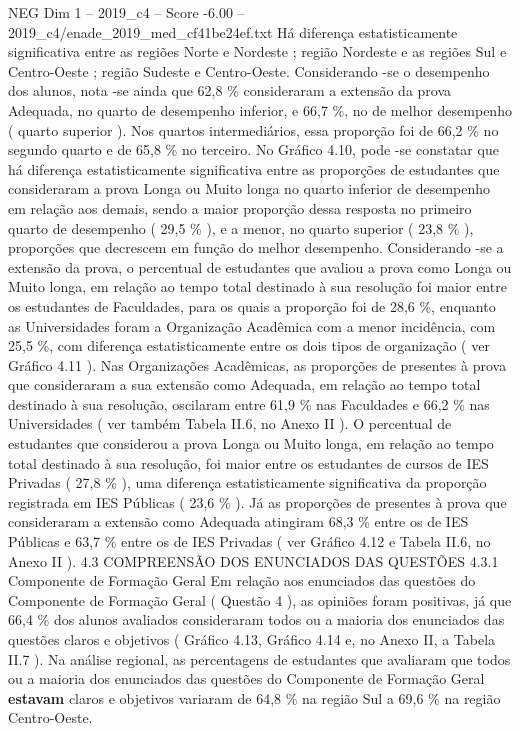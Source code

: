 \begin{textsample}{NEG Dim 1 – 2019\_c4 – Score -6.00 – 2019\_c4/enade\_2019\_med\_cf41be24ef.txt}
Há diferença estatisticamente significativa entre as regiões Norte e Nordeste ; região Nordeste e as regiões Sul e Centro-Oeste ; região Sudeste e Centro-Oeste.
Considerando -se o desempenho dos alunos, nota -se ainda que 62,8 \% consideraram a extensão da prova Adequada, no quarto de desempenho inferior, e 66,7 \%, no de melhor desempenho ( quarto superior ).
Nos quartos intermediários, essa proporção foi de 66,2 \% no segundo quarto e de 65,8 \% no terceiro.
No Gráfico 4.10, pode -se constatar que há diferença estatisticamente significativa entre as proporções de estudantes que consideraram a prova Longa ou Muito longa no quarto inferior de desempenho em relação aos demais, sendo a maior proporção dessa resposta no primeiro quarto de desempenho ( 29,5 \% ), e a menor, no quarto superior ( 23,8 \% ), proporções que decrescem em função do melhor desempenho.
Considerando -se a extensão da prova, o percentual de estudantes que avaliou a prova como Longa ou Muito longa, em relação ao tempo total destinado à sua resolução foi maior entre os estudantes de Faculdades, para os quais a proporção foi de 28,6 \%, enquanto as Universidades foram a Organização Acadêmica com a menor incidência, com 25,5 \%, com diferença estatisticamente entre os dois tipos de organização ( ver Gráfico 4.11 ).
Nas Organizações Acadêmicas, as proporções de presentes à prova que consideraram a sua extensão como Adequada, em relação ao tempo total destinado à sua resolução, oscilaram entre 61,9 \% nas Faculdades e 66,2 \% nas Universidades ( ver também Tabela II.6, no Anexo II ).
O percentual de estudantes que considerou a prova Longa ou Muito longa, em relação ao tempo total destinado à sua resolução, foi maior entre os estudantes de cursos de IES Privadas ( 27,8 \% ), uma diferença estatisticamente significativa da proporção registrada em IES Públicas ( 23,6 \% ).
Já as proporções de presentes à prova que consideraram a extensão como Adequada atingiram 68,3 \% entre os de IES Públicas e 63,7 \% entre os de IES Privadas ( ver Gráfico 4.12 e Tabela II.6, no Anexo II ). 4.3 COMPREENSÃO DOS ENUNCIADOS DAS QUESTÕES 4.3.1 Componente de Formação Geral Em relação aos enunciados das questões do Componente de Formação Geral ( Questão 4 ), as opiniões foram positivas, já que 66,4 \% dos alunos avaliados consideraram todos ou a maioria dos enunciados das questões claros e objetivos ( Gráfico 4.13, Gráfico 4.14 e, no Anexo II, a Tabela II.7 ).
Na análise regional, as percentagens de estudantes que avaliaram que todos ou a maioria dos enunciados das questões do Componente de Formação Geral \textbf{estavam} claros e objetivos variaram de 64,8 \% na região Sul a 69,6 \% na região Centro-Oeste.

\end{textsample}
